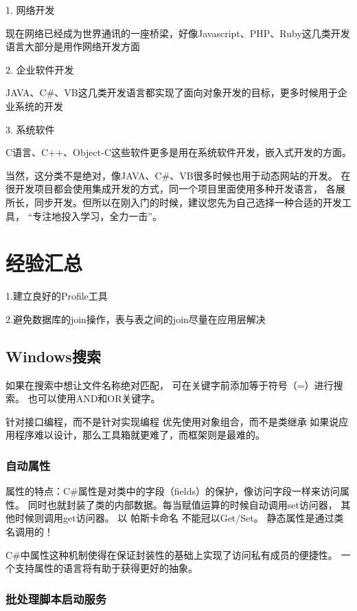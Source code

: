 \documentclass{book}
\begin{document}
1. 网络开发

现在网络已经成为世界通讯的一座桥梁，好像Javascript、PHP、Ruby这几类开发语言大部分是用作网络开发方面

2. 企业软件开发

JAVA、C\#、VB这几类开发语言都实现了面向对象开发的目标，更多时候用于企业系统的开发

3. 系统软件

C语言、C++、Object-C这些软件更多是用在系统软件开发，嵌入式开发的方面。

当然，这分类不是绝对，像JAVA、C\#、VB很多时候也用于动态网站的开发。
在很开发项目都会使用集成开发的方式，同一个项目里面使用多种开发语言，
各展所长，同步开发。但所以在刚入门的时候，建议您先为自己选择一种合适的开发工具，
“专注地投入学习，全力一击”。




\chapter{经验汇总}

1.建立良好的Profile工具

2.避免数据库的join操作，表与表之间的join尽量在应用层解决


\section{Windows搜索}

如果在搜索中想让文件名称绝对匹配，
可在关键字前添加等于符号（=）进行搜索。
也可以使用AND和OR关键字。

针对接口编程，而不是针对实现编程\newline
优先使用对象组合，而不是类继承\newline
如果说应用程序难以设计，那么工具箱就更难了，而框架则是最难的。

\subsection{自动属性}

属性的特点：C\#属性是对类中的字段（fields）的保护，像访问字段一样来访问属性。
同时也就封装了类的内部数据。每当赋值运算的时候自动调用set访问器，
其他时候则调用get访问器。 以 帕斯卡命名 不能冠以Get/Set。
静态属性是通过类名调用的！

C\#中属性这种机制使得在保证封装性的基础上实现了访问私有成员的便捷性。
一个支持属性的语言将有助于获得更好的抽象。




\subsection{批处理脚本启动服务}
\end{document}
